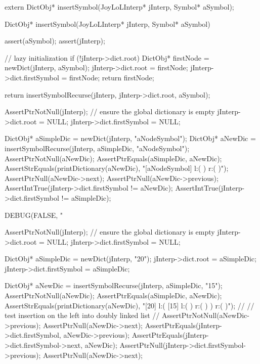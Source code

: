 \startCHeader
extern DictObj* insertSymbol(JoyLoLInterp* jInterp, Symbol* aSymbol);
\stopCHeader

\startCCode
DictObj* insertSymbol(JoyLoLInterp* jInterp, Symbol* aSymbol) {
  assert(aSymbol);
  assert(jInterp);

  // lazy initialization
  if (!jInterp->dict.root) {
    DictObj* firstNode = newDict(jInterp, aSymbol);
    jInterp->dict.root        = firstNode;
    jInterp->dict.firstSymbol = firstNode;
    return firstNode;
  }

  return insertSymbolRecurse(jInterp, jInterp->dict.root, aSymbol);
}
\stopCCode

\startCTest
  AssertPtrNotNull(jInterp);
  // ensure the global dictionary is empty
  jInterp->dict.root        = NULL;
  jInterp->dict.firstSymbol = NULL;
  
  DictObj* aSimpleDic = newDict(jInterp, "aNodeSymbol");
  DictObj* aNewDic = insertSymbolRecurse(jInterp, aSimpleDic, "aNodeSymbol");
  AssertPtrNotNull(aNewDic);
  AssertPtrEquals(aSimpleDic, aNewDic);
  AssertStrEquals(printDictionary(aNewDic),
  "[aNodeSymbol] l:(  ) r:(  )");
  AssertPtrNull(aNewDic->next);
  AssertPtrNull(aNewDic->previous);
  AssertIntTrue(jInterp->dict.firstSymbol != aNewDic);
  AssertIntTrue(jInterp->dict.firstSymbol != aSimpleDic);
\stopCTest
\stopTestCase

\startCTest
  DEBUG(FALSE, "\n%

  AssertPtrNotNull(jInterp);
  // ensure the global dictionary is empty
  jInterp->dict.root        = NULL;
  jInterp->dict.firstSymbol = NULL;

  DictObj* aSimpleDic = newDict(jInterp, "20");
  jInterp->dict.root        = aSimpleDic;
  jInterp->dict.firstSymbol = aSimpleDic;

  DictObj* aNewDic = insertSymbolRecurse(jInterp, aSimpleDic, "15");
  AssertPtrNotNull(aNewDic);
  AssertPtrEquals(aSimpleDic, aNewDic);
  AssertStrEquals(printDictionary(aNewDic),
  "[20] l:( [15] l:(  ) r:(  )  ) r:(  )");
  //
  // test insertion on the left into doubly linked list
  //
  AssertPtrNotNull(aNewDic->previous);
  AssertPtrNull(aNewDic->next);
  AssertPtrEquals(jInterp->dict.firstSymbol, aNewDic->previous);
  AssertPtrEquals(jInterp->dict.firstSymbol->next, aNewDic);
  AssertPtrNull(jInterp->dict.firstSymbol->previous);
  AssertPtrNull(aNewDic->next);

